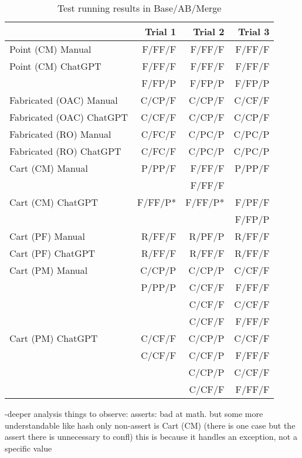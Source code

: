 \begin{table}[t]
    \centering
    \begin{tabular}{@{\extracolsep{\fill}} lrrr} \toprule
                             & Trial 1 & Trial 2 & Trial 3 \\
    \midrule
    Point (CM) Manual        & F/FF/F & F/FF/F & F/FF/F \\
    Point (CM) ChatGPT       & F/FF/F & F/FF/F & F/FF/F \\
                             & F/FP/P & F/FP/P & F/FP/P \\
    Fabricated (OAC) Manual  & C/CP/F & C/CP/F & C/CF/F \\
    Fabricated (OAC) ChatGPT & C/CF/F & C/CP/F & C/CP/F \\
    Fabricated (RO) Manual   & C/FC/F & C/PC/P & C/PC/P \\
    Fabricated (RO) ChatGPT  & C/FC/F & C/PC/P & C/PC/P \\
    Cart (CM) Manual         & P/PP/F & F/FF/F & P/PP/F \\
                             &  & F/FF/F &  \\
    Cart (CM) ChatGPT        & F/FF/P* & F/FF/P* & F/PF/F \\
                             &  &  & F/FP/P \\
    Cart (PF) Manual         & R/FF/F & R/PF/P & R/FF/F \\
    Cart (PF) ChatGPT        & R/FF/F & R/FF/F & R/FF/F \\
    Cart (PM) Manual         & C/CP/P & C/CP/P & C/CF/F \\
                             & P/PP/P & C/CF/F & F/FF/F \\
                             &  & C/CF/F & C/CF/F \\
                             &  & C/CF/F & F/FF/F \\
    Cart (PM) ChatGPT        & C/CF/F & C/CP/P & C/CF/F \\
                             & C/CF/F & C/CF/P & F/FF/F \\
                             &  & C/CP/P & C/CF/F \\
                             &  & C/CF/F & F/FF/F \\
    \midrule
    \end{tabular}
    \caption{Test running results in Base/AB/Merge \label{tab:results:rq2tests}}
\end{table}


-deeper analysis things to observe:
asserts: bad at math. but some more understandable like hash
only non-assert is Cart (CM) (there is one case but the assert there is unnecessary to confl)
this is because it handles an exception, not a specific value



